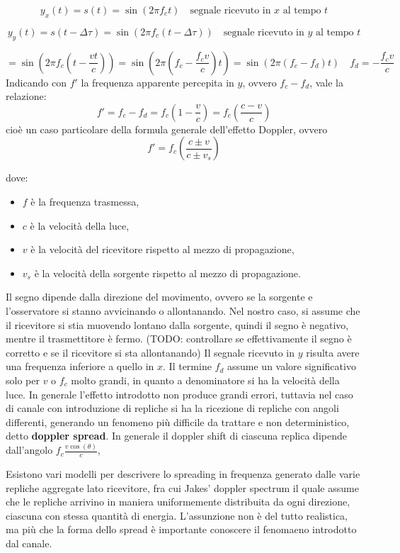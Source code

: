 \[
    y_x(t) = s(t) = \sin(2\pi f_c t) \quad \text{segnale ricevuto in $x$ al tempo $t$}
\]

\[
    y_y(t) = s(t-\Delta \tau) = \sin(2\pi f_c (t-\Delta \tau)) \quad \text{segnale ricevuto in $y$ al tempo $t$}
\]

\[
    = \sin\left(2\pi f_c \left(t - \frac{vt}{c}\right)\right) = \sin\left(2\pi \left(f_c - \frac{f_c v}{c}\right) t\right) = \sin\left(2\pi \left(f_c - f_d \right) t \right) \quad \boxed{f_d = -\frac{f_c v}{c}}
\]
Indicando con $f'$ la frequenza apparente percepita in $y$, ovvero $f_c - f_d$, vale la relazione:
\[
    f' = f_c - f_d = f_c \left(1 - \frac{v}{c}\right) = f_c \left( \frac{c - v}{c} \right)
\]
cioè un caso particolare della formula generale dell'effetto Doppler, ovvero
\[
    f' = f_c \left( \frac{c \pm v}{c \pm v_s} \right)
\]

dove:
\begin{itemize}
    \item $f$ è la frequenza trasmessa,
    \item $c$ è la velocità della luce,
    \item $v$ è la velocità del ricevitore rispetto al mezzo di propagazione,
    \item $v_s$ è la velocità della sorgente rispetto al mezzo di propagazione.
\end{itemize}


Il segno dipende dalla direzione del movimento, ovvero se la sorgente e l'osservatore si stanno avvicinando o allontanando. Nel nostro caso, si assume che il ricevitore si stia muovendo lontano dalla sorgente, quindi il segno è negativo, mentre il trasmettitore è fermo.
(TODO: controllare se effettivamente il segno è corretto e se il ricevitore si sta allontanando)
Il segnale ricevuto in $y$ risulta avere una frequenza inferiore a quello in $x$. Il termine $f_d$ assume un valore significativo solo per $v$ o $f_c$ molto grandi, in quanto a denominatore si ha la velocità della luce. In generale l'effetto introdotto non produce grandi errori, tuttavia nel caso di canale con introduzione di repliche si ha la ricezione di repliche con angoli differenti, generando un fenomeno più difficile da trattare e non deterministico, detto \textbf{doppler spread}.
In generale il doppler shift di ciascuna replica dipende dall'angolo $f_c \frac{v \cos(\theta)}{c}$, 

Esistono vari modelli per descrivere lo spreading in frequenza generato dalle varie repliche aggregate lato ricevitore, fra cui Jakes' doppler spectrum il quale assume che le repliche arrivino in maniera uniformemente distribuita da ogni direzione, ciascuna con stessa quantità di energia. L'assunzione non è del tutto realistica, ma più che la forma dello spread è importante conoscere il fenomaeno introdotto dal canale.



